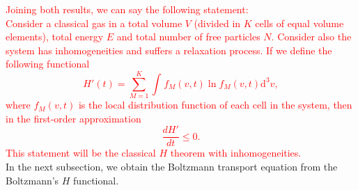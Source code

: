 \documentclass{article}
\begin{document}
\textcolor{red}{Joining both results, we can say the following statement:\\
Consider a classical gas in a total volume $V$ (divided in $K$ cells of equal volume elements), total energy $E$ and total number of free particles $N$. Consider also the system has inhomogeneities and suffers a relaxation process. If we define the following functional
\begin{equation}
   H'(t)=\sum_{M=1}^{K}\int_{}^{} f_M(v,t) \ln f_M(v,t)\mathrm{d}^3v  \label{CH3},
\end{equation}
where $f_M(v,t)$ is the local distribution function of each cell in the system, then in the first-order approximation
\begin{equation}
    \frac{dH'}{dt} \leq 0.
\end{equation}
This statement will be the classical $H$ theorem with inhomogeneities.}
\\
In the next subsection, we obtain the Boltzmann transport equation from the Boltzmann's $H$ functional.
\end{document}
